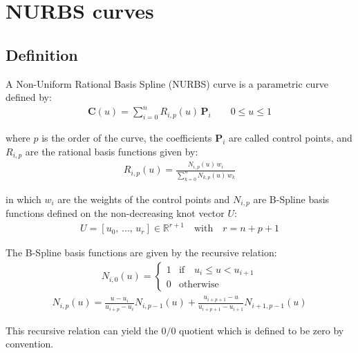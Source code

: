 \section{NURBS curves}

\subsection{Definition}

A Non-Uniform Rational Basis Spline (NURBS) curve is a parametric curve defined by:
\begin{align}
    \label{eq:def_nurbs_curve}
    \mathbf{C}(u)=\sum_{i=0}^{n} R_{i,p}(u) \, \mathbf{P}_{i} \quad \quad 0 \leq u \leq 1
\end{align}

where $p$ is the order of the curve, the coefficients $\mathbf{P}_{i}$ are called control points, and $R_{i,p}$ are the rational basis functions given by:
\begin{align}
    R_{i,p}(u) = \frac{N_{i,p}(u) \, w_{i}}{\sum\limits_{k=0}^{n} N_{k,p}(u) \, w_{k}}
\end{align}

in which $w_{i}$ are the weights of the control points and $N_{i,p}$ are B-Spline basis functions defined on the non-decreasing knot vector $U$:
\begin{align}
    U = [u_0,\, \dots,\, u_{r}] \in \mathds{R}^{r+1} \quad \text{with} \quad r = n + p + 1
\end{align}

The B-Spline basis functions are given by the recursive relation:
\begin{align}
    N_{i,0}(u) =  \begin{cases}
    1& \mathrm{if} \quad u_{i}\leq u<u_{i+1}\\
    0& \mathrm{otherwise}
    \end{cases}
\end{align}
\begin{align}
 N_{i,p}(u) = \frac {u-u_{i}}{u_{i+p}-u_{i}} N_{i,p-1}(u) + \frac {u_{i+p+1}-u}{u_{i+p+1}-u_{i+1}} N_{i+1,p-1}(u)
\end{align}

This recursive relation can yield the $0/0$ quotient which is defined to be zero by convention.


